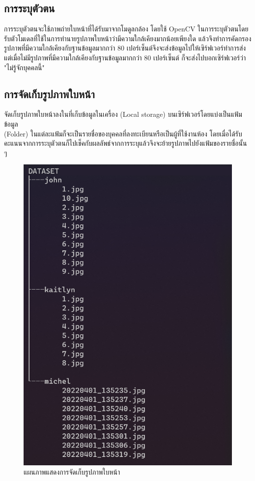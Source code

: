 \subsection{การระบุตัวตน}
การระบุตัวตนจะใช้ภาพถ่ายใบหน้าที่ได้รับมาจากโมดูลกล้อง โดยใช้ OpenCV ในการระบุตัวตนโดยรับตัวโมเดลที่ใช้ในการทำนายรูปภาพใบหน้าว่ามีความใกล้เคียงมากน้อยเพียงใด
แล้วจึงทำการคัดกรองรูปภาพที่มีความใกล้เคียงกับฐานข้อมูลมากกว่า 80 เปอร์เซ็นต์จึงจะส่งข้อมูลไปให้เซิร์ฟเวอร์ทำการส่ง 
แต่เมื่อไม่มีรูปภาพที่มีความใกล้เคียงกับฐานข้อมูลมากกว่า 80 เปอร์เซ็นต์ ก็จะส่งไปบอกเซิร์ฟเวอร์ว่า "ไม่รู้จักบุคคลนี้"

\subsection{การจัดเก็บรูปภาพใบหน้า}
จัดเก็บรูปภาพใบหน้าลงในที่เก็บข้อมูลในเครื่อง (Local storage) บนเซิร์ฟเวอร์โดยแบ่งเป็นแฟ้มข้อมูล \\(Folder) 
ในแต่ละแฟ้มก็จะเป็นรายชื่อของบุคคลที่ลงทะเบียนหรือเป็นผู้ที่ใช้งานห้อง 
โดยเมื่อได้รับคะแนนจากการระบุตัวตนก็ไปเช็คกับผลลัพธ์จากการระบุแล้วจึงจะย้ายรูปภาพไปยังแฟ้มของรายชื่อนั้น ๆ

\begin{figure}[h]
  \begin{center}
    \includegraphics[scale=.5]{pic/dataset.png}
  \caption[Poem]{แผนภาพแสดงการจัดเก็บรูปภาพใบหน้า}
  \end{center}
  \label{fig:folder}
\end{figure}
\newpage

